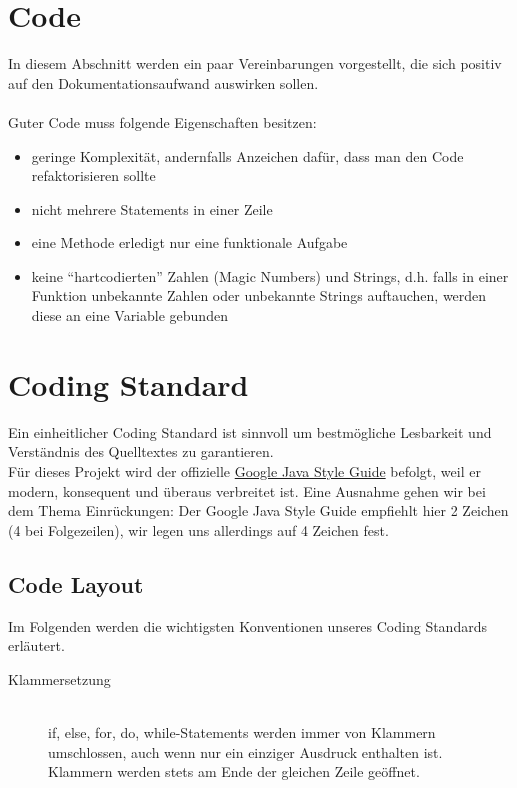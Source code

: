 \section{Code}
In diesem Abschnitt werden ein paar Vereinbarungen vorgestellt, die sich positiv auf den Dokumentationsaufwand auswirken sollen.\\
\\Guter Code muss folgende Eigenschaften besitzen:
\begin{itemize}
	\item geringe Komplexität, andernfalls Anzeichen dafür, dass man den Code refaktorisieren sollte
	\item nicht mehrere Statements in einer Zeile
	\item eine Methode erledigt nur eine funktionale Aufgabe
	\item keine ``hartcodierten'' Zahlen (Magic Numbers) und Strings,
d.h. falls in einer Funktion unbekannte Zahlen oder unbekannte Strings auftauchen, werden diese an eine Variable gebunden
\end{itemize}

\section{Coding Standard}
Ein einheitlicher Coding Standard ist sinnvoll um bestmögliche Lesbarkeit und Verständnis des Quelltextes zu garantieren.
\\Für dieses Projekt wird der offizielle \href{https://google.github.io/styleguide/javaguide.html}{Google Java Style Guide} befolgt, weil er modern, konsequent und überaus verbreitet ist. Eine Ausnahme gehen wir bei dem Thema Einrückungen: Der Google Java Style Guide empfiehlt hier 2 Zeichen (4 bei Folgezeilen), wir legen uns allerdings auf 4 Zeichen fest.

\subsection{Code Layout}
Im Folgenden werden die wichtigsten Konventionen unseres Coding Standards erläutert.

\begin{description}
\item[Klammersetzung]\hfill 
\\if, else, for, do, while-Statements werden immer von Klammern umschlossen, auch wenn nur 	ein einziger Ausdruck enthalten ist. 
\\Klammern werden stets am Ende der gleichen Zeile geöffnet.
\end{description}


